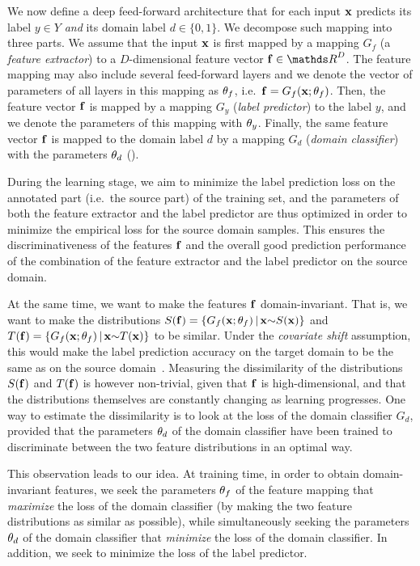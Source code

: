 We now define a deep feed-forward architecture that for each input ${\mathbf x}$ predicts its label $y \in Y$ {\em and} its domain label $d \in \{0,1\}$. We decompose such mapping into three parts. We assume that the input ${\mathbf x}$ is first mapped by a mapping $G_f$ (a {\em feature extractor}) to a $D$-dimensional feature vector $\f \in \R^D$. The feature mapping may also include several feed-forward layers and we denote the vector of parameters of all layers in this mapping as ${\theta_f}$, i.e.\ ${\mathbf f} = G_f({\mathbf x};{\theta_f})$. Then, the feature vector ${\mathbf f}$ is mapped by a mapping $G_y$ ({\em label predictor}) to the label $y$, and we denote the parameters of this mapping with ${\theta_y}$. Finally, the same feature vector ${\mathbf f}$ is mapped to the domain label $d$ by a mapping $G_d$ ({\em domain classifier}) with the parameters ${\theta_d}$ ().

During the learning stage, we aim to minimize the label prediction loss on the annotated part (i.e.\ the source part) of the training set, and the parameters of both the feature extractor and the label predictor are thus optimized in order to minimize the empirical loss for the source domain samples. This ensures the discriminativeness of the features ${\mathbf f}$ and the overall good prediction performance of the combination of the feature extractor and the label predictor on the source domain.

At the same time, we want to make the features ${\mathbf f}$ domain-invariant. That is, we want to make the distributions $S({\mathbf f}) = \{G_f({\mathbf x}; {\theta_f})\,|\, {\mathbf x}{\sim}S({\mathbf x})\}$ and $T({\mathbf f}) = \{G_f({\mathbf x}; {\theta_f})\,|\, {\mathbf x}{\sim}T({\mathbf x})\}$ to be similar. Under the {\em covariate shift} assumption, this would make the label prediction accuracy on the target domain to be the same as on the source domain~\cite{Shimodaira00}. Measuring the dissimilarity of the distributions $S({\mathbf f})$ and $T({\mathbf f})$ is however non-trivial, given that ${\mathbf f}$ is high-dimensional, and that the distributions themselves are constantly changing as learning progresses. One way to estimate the dissimilarity is to look at the loss of the domain classifier $G_d$, provided that the parameters ${\theta_d}$ of the domain classifier have been trained to discriminate between the two feature distributions in an optimal way. 

This observation leads to our idea. At training time, in order to obtain domain-invariant features, we seek the parameters ${\theta_f}$ of the feature mapping that {\em maximize} the loss of the domain classifier (by making the two feature distributions as similar as possible), while simultaneously seeking the parameters ${\theta_d}$ of the domain classifier that {\em minimize} the loss of the domain classifier. In addition, we seek to minimize the loss of the label predictor. 

